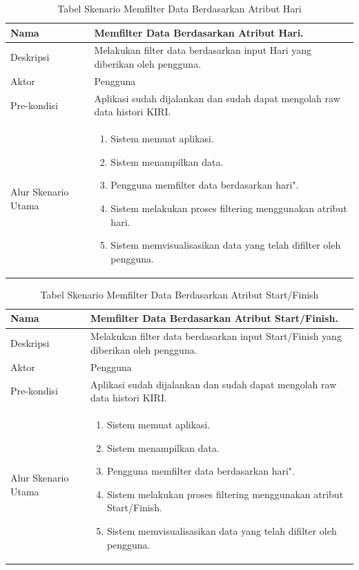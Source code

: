 \begin{table}[H]
    \centering
    \caption{Tabel Skenario Memfilter Data Berdasarkan Atribut Hari}
    \begin{tabular}{|p{3cm}|p{10cm}|}
    \hline
        Nama & Memfilter Data Berdasarkan Atribut Hari.\\
    \hline
    \hline
        Deskripsi &  Melakukan filter data berdasarkan input Hari yang diberikan oleh pengguna. \\
    \hline
        Aktor & Pengguna \\
    \hline
        Pre-kondisi & Aplikasi sudah dijalankan dan sudah dapat mengolah raw data histori KIRI.\\
    \hline
        Alur Skenario Utama & 
        \begin{enumerate}
            \item Sistem memuat aplikasi.
            \item Sistem menampilkan data.
            \item Pengguna memfilter data berdasarkan hari".
            \item Sistem melakukan proses filtering menggunakan atribut hari.
            \item Sistem memvisualisasikan data yang telah difilter oleh pengguna.
        \end{enumerate}\\
    \hline
    \end{tabular}
    \label{tab:skenario1}
\end{table}

\begin{table}[H]
    \centering
    \caption{Tabel Skenario Memfilter Data Berdasarkan Atribut Start/Finish}
    \begin{tabular}{|p{3cm}|p{10cm}|}
    \hline
        Nama & Memfilter Data Berdasarkan Atribut  Start/Finish.\\
    \hline
    \hline
        Deskripsi &  Melakukan filter data berdasarkan input  Start/Finish yang diberikan oleh pengguna. \\
    \hline
        Aktor & Pengguna \\
    \hline
        Pre-kondisi & Aplikasi sudah dijalankan dan sudah dapat mengolah raw data histori KIRI.\\
    \hline
        Alur Skenario Utama & 
        \begin{enumerate}
            \item Sistem memuat aplikasi.
            \item Sistem menampilkan data.
            \item Pengguna memfilter data berdasarkan hari".
            \item Sistem melakukan proses filtering menggunakan atribut  Start/Finish.
            \item Sistem memvisualisasikan data yang telah difilter oleh pengguna.
        \end{enumerate}\\
    \hline
    \end{tabular}
    \label{tab:skenario1}
\end{table}

